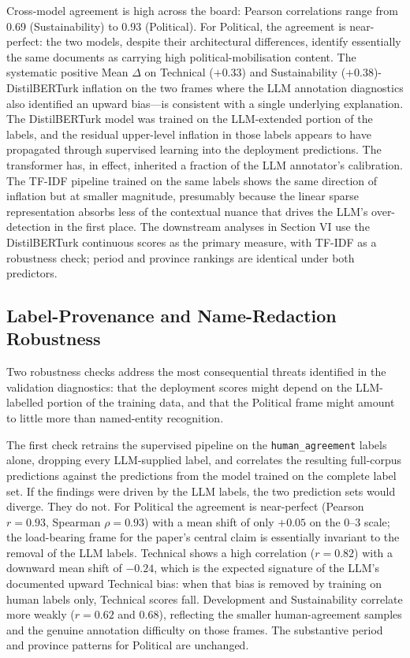 \documentclass[12pt, journal]{IEEEtran}
\begin{document}
Cross-model agreement is high across the board: Pearson correlations range from 0.69 (Sustainability) to 0.93 (Political). For Political, the agreement is near-perfect: the two models, despite their architectural differences, identify essentially the same documents as carrying high political-mobilisation content. The systematic positive Mean $\Delta$ on Technical ($+0.33$) and Sustainability ($+0.38$)-DistilBERTurk inflation on the two frames where the LLM annotation diagnostics also identified an upward bias---is consistent with a single underlying explanation. The DistilBERTurk model was trained on the LLM-extended portion of the labels, and the residual upper-level inflation in those labels appears to have propagated through supervised learning into the deployment predictions. The transformer has, in effect, inherited a fraction of the LLM annotator's calibration. The TF-IDF pipeline trained on the same labels shows the same direction of inflation but at smaller magnitude, presumably because the linear sparse representation absorbs less of the contextual nuance that drives the LLM's over-detection in the first place. The downstream analyses in Section VI use the DistilBERTurk continuous scores as the primary measure, with TF-IDF as a robustness check; period and province rankings are identical under both predictors.

\subsection{Label-Provenance and Name-Redaction Robustness}
Two robustness checks address the most consequential threats identified in the validation diagnostics: that the deployment scores might depend on the LLM-labelled portion of the training data, and that the Political frame might amount to little more than named-entity recognition.

The first check retrains the supervised pipeline on the \texttt{human\_agreement} labels alone, dropping every LLM-supplied label, and correlates the resulting full-corpus predictions against the predictions from the model trained on the complete label set. If the findings were driven by the LLM labels, the two prediction sets would diverge. They do not. For Political the agreement is near-perfect (Pearson $r = 0.93$, Spearman $\rho = 0.93$) with a mean shift of only $+0.05$ on the 0--3 scale; the load-bearing frame for the paper's central claim is essentially invariant to the removal of the LLM labels. Technical shows a high correlation ($r = 0.82$) with a downward mean shift of $-0.24$, which is the expected signature of the LLM's documented upward Technical bias: when that bias is removed by training on human labels only, Technical scores fall. Development and Sustainability correlate more weakly ($r = 0.62$ and $0.68$), reflecting the smaller human-agreement samples and the genuine annotation difficulty on those frames. The substantive period and province patterns for Political are unchanged.
\end{document}
